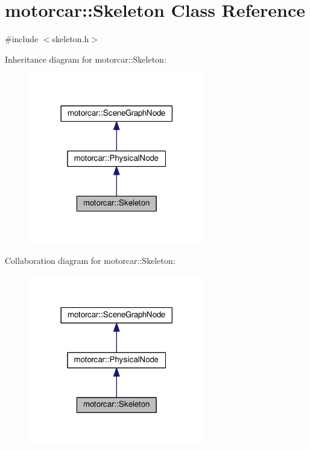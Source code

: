\hypertarget{classmotorcar_1_1Skeleton}{\section{motorcar\-:\-:Skeleton Class Reference}
\label{classmotorcar_1_1Skeleton}
}


{\ttfamily \#include $<$skeleton.\-h$>$}



Inheritance diagram for motorcar\-:\-:Skeleton\-:
\nopagebreak
\begin{figure}[H]
\begin{center}
\leavevmode
\includegraphics[width=218pt]{classmotorcar_1_1Skeleton__inherit__graph}
\end{center}
\end{figure}


Collaboration diagram for motorcar\-:\-:Skeleton\-:
\nopagebreak
\begin{figure}[H]
\begin{center}
\leavevmode
\includegraphics[width=218pt]{classmotorcar_1_1Skeleton__coll__graph}
\end{center}
\end{figure}
